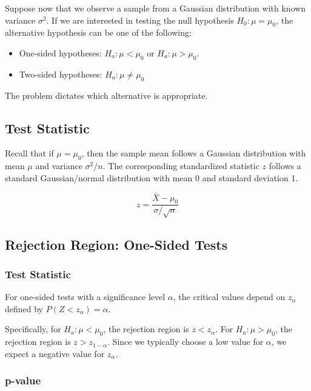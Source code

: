 \documentclass[
  letterpaper,
  DIV=11,
  numbers=noendperiod]{scrartcl}
\providecommand{\tightlist}{%
  \setlength{\itemsep}{0pt}\setlength{\parskip}{0pt}}
\begin{document}
Suppose now that we observe a sample from a Gaussian distribution with
known variance \(\sigma^2\). If we are interested in testing the null
hypothesis \(H_0: \mu=\mu_0\), the alternative hypothesis can be one of
the following:

\begin{itemize}
\tightlist
\item
  One-sided hypotheses: \(H_a: \mu < \mu_0\) or \(H_a: \mu > \mu_0\).
\item
  Two-sided hypotheses: \(H_a: \mu \neq \mu_0\)
\end{itemize}

The problem dictates which alternative is appropriate.

\subsection{Test Statistic}\label{test-statistic}

Recall that if \(\mu=\mu_0\), then the sample mean follows a Gaussian
distribution with mean \(\mu\) and variance \(\sigma^2/n\). The
corresponding standardized statistic \(z\) follows a standard
Gaussian/normal distribution with mean 0 and standard deviation 1.

\[
z = \frac{\bar{X}-\mu_0}{\sigma/\sqrt{n}}
\]

\subsection{Rejection Region: One-Sided
Tests}\label{rejection-region-one-sided-tests}

\subsubsection{Test Statistic}

For one-sided tests with a significance level \(\alpha\), the critical
values depend on \(z_\alpha\) defined by \(P(Z < z_\alpha) = \alpha\).

Specifically, for \(H_a: \mu < \mu_0\), the rejection region is
\(z < z_\alpha\). For \(H_a: \mu > \mu_0\), the rejection region is
\(z > z_{1-\alpha}\). Since we typically choose a low value for
\(\alpha\), we expect a negative value for \(z_\alpha\).

\subsubsection{p-value}
\end{document}

